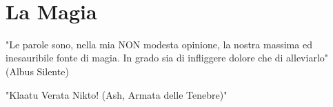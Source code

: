 \documentclass[a4paper,twoside,openany]{book}
\begin{document}
    \newpage~




	\setcounter{page}{1}
	\pagebreak

	\begin{multicols}{2}
		{\small \tableofcontents{}}
	\end{multicols}

	\pagebreak{}



\section{La Magia}


\label{la-magia}
\begin{tcolorbox}[enhanced,arc=5pt,boxrule=0.3pt]{
"Le parole sono, nella mia NON modesta opinione, la nostra massima ed inesauribile fonte di magia. In grado sia di infliggere dolore che di alleviarlo" (Albus Silente)

		\medskip

"Klaatu Verata Nikto! (Ash, Armata delle Tenebre)"

} \end{tcolorbox}
\end{document}
